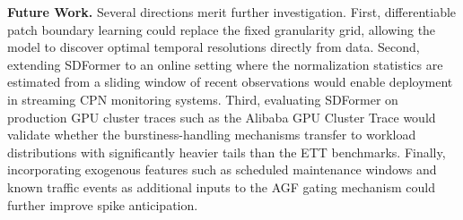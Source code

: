 \documentclass[journal]{IEEEtran}
\begin{document}
\textbf{Future Work.}
Several directions merit further investigation.
First, differentiable patch boundary learning could replace the fixed
granularity grid, allowing the model to discover optimal temporal
resolutions directly from data.
Second, extending SDFormer to an online setting where the normalization
statistics are estimated from a sliding window of recent observations
would enable deployment in streaming CPN monitoring systems.
Third, evaluating SDFormer on production GPU cluster traces such as the
Alibaba GPU Cluster Trace would validate whether the burstiness-handling
mechanisms transfer to workload distributions with significantly heavier
tails than the ETT benchmarks.
Finally, incorporating exogenous features such as scheduled maintenance
windows and known traffic events as additional inputs to the AGF gating
mechanism could further improve spike anticipation.






\end{document}
